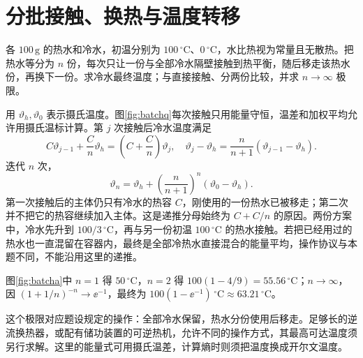 \section{分批接触、换热与温度转移}
\begin{example}[分批热水加热冷水的极限]\label{ex:batchwater}
各 $100\,\mathrm g$ 的热水和冷水，初温分别为 $100\,^\circ\mathrm C$、$0\,^\circ\mathrm C$，水比热视为常量且无散热。把热水等分为 $n$ 份，每次只让一份与全部冷水隔壁接触到热平衡，随后移走该热水份，再换下一份。求冷水最终温度；与直接接触、分两份比较，并求 $n\to\infty$ 极限。
\end{example}
\begin{solution}
用 $\vartheta_h,\vartheta_0$ 表示摄氏温度。图\ref{fig:batchq}每次接触只用能量守恒，温差和加权平均允许用摄氏温标计算。第 $j$ 次接触后冷水温度满足
\[
 C\vartheta_{j-1}+\frac Cn\vartheta_h
 =\left(C+\frac Cn\right)\vartheta_j,
 \quad\vartheta_j-\vartheta_h=\frac n{n+1}(\vartheta_{j-1}-\vartheta_h).
\]
迭代 $n$ 次，
\[
 \vartheta_n=\vartheta_h+
 \left(\frac n{n+1}\right)^n(\vartheta_0-\vartheta_h).
\]
第一次接触后的主体仍只有冷水的热容 $C$，刚使用的一份热水已被移走；第二次并不把它的热容继续加入主体。这是递推分母始终为 $C+C/n$ 的原因。两份方案中，冷水先升到 $100/3\,^\circ\mathrm C$，再与另一份初温 $100\,^\circ\mathrm C$ 的热水接触。若把已经用过的热水也一直混留在容器内，最终是全部冷热水直接混合的能量平均，操作协议与本题不同，不能沿用这里的递推。

图\ref{fig:batcha}中 $n=1$ 得 $50\,^\circ\mathrm C$，$n=2$ 得 $100(1-4/9)=55.56\,^\circ\mathrm C$；$n\to\infty$，因 $(1+1/n)^{-n}\to\ee^{-1}$，最终为 $100(1-\ee^{-1})\,^\circ\mathrm C\approx63.21\,^\circ\mathrm C$。

这个极限对应题设规定的操作：全部冷水保留，热水分份使用后移走。足够长的逆流换热器，或配有储功装置的可逆热机，允许不同的操作方式，其最高可达温度须另行求解。这里的能量式可用摄氏温差，计算熵时则须把温度换成开尔文温度。
\end{solution}

